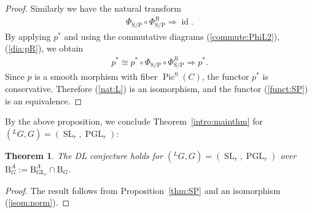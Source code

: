 \documentclass[11pt,oneside,a4paper,mathscr]{amsart}
\newtheorem{thm}{Theorem}[section]
\theoremstyle{definition}
\newcommand{\Pic}{\operatorname{Pic}}
\newcommand{\rB}{\mathrm{B}}
\newcommand{\id}{\operatorname{id}}
\newcommand{\GL}{\operatorname{GL}}
\newcommand{\SL}{\operatorname{SL}}
\newcommand{\PGL}{\operatorname{PGL}}
\newcommand{\rS}{\mathrm{S}}
\newcommand{\rP}{\mathrm{P}}
\begin{document}
\begin{proof}
Similarly we have the natural transform 
\begin{align}\label{nat:L}
    \Phi_{\rS/\rP} \circ \Phi_{\rS/\rP}^R \Rightarrow \id.
\end{align}
By applying $p^*$ and using the commutative diagrams (\ref{commute:PhiL2}), (\ref{dia:pR}), 
we obtain 
\begin{align*}
  p^*\cong  p^*  \circ \Phi_{\rS/\rP} \circ \Phi_{\rS/\rP}^R \Rightarrow p^*.
\end{align*}
Since $p$ is a smooth morphism with fiber $\Pic^0(C)$, the functor $p^*$ is 
conservative. Therefore (\ref{nat:L}) is an isomorphism, and 
the functor (\ref{funct:SP}) is an equivalence. 
\end{proof}

By the above proposition, we conclude Theorem~\ref{intro:mainthm} for 
$(^{L}G, G)=(\SL_r, \PGL_r)$:
\begin{thm}\label{thm:SL}
The DL conjecture holds for $(^{L}G, G)=(\SL_r, \PGL_r)$ 
over $\rB_{G}^A:=\rB_{\GL_r}^A \cap \rB_{G}$. 
\end{thm}
\begin{proof}
    The result follows from Proposition~\ref{thm:SP} and an isomorphism (\ref{isom:norm}). 
\end{proof}
\end{document}

